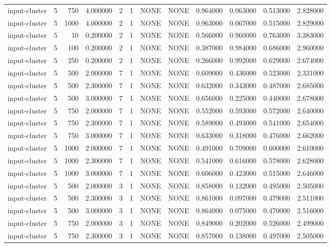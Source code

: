 \begin{tabular}{lrrrllllrrrr}
input-cluster & 5 & 750 & 4.000000 & 2 & 1 & NONE & NONE & 0.964000 & 0.063000 & 0.513000 & 2.828000 \\
input-cluster & 5 & 1000 & 4.000000 & 2 & 1 & NONE & NONE & 0.963000 & 0.067000 & 0.515000 & 2.829000 \\
input-cluster & 5 & 10 & 0.200000 & 2 & 1 & NONE & NONE & 0.566000 & 0.960000 & 0.763000 & 3.383000 \\
input-cluster & 5 & 100 & 0.200000 & 2 & 1 & NONE & NONE & 0.387000 & 0.984000 & 0.686000 & 2.960000 \\
input-cluster & 5 & 250 & 0.200000 & 2 & 1 & NONE & NONE & 0.266000 & 0.992000 & 0.629000 & 2.674000 \\
input-cluster & 5 & 500 & 2.000000 & 7 & 1 & NONE & NONE & 0.609000 & 0.436000 & 0.523000 & 2.331000 \\
input-cluster & 5 & 500 & 2.300000 & 7 & 1 & NONE & NONE & 0.632000 & 0.343000 & 0.487000 & 2.685000 \\
input-cluster & 5 & 500 & 3.000000 & 7 & 1 & NONE & NONE & 0.656000 & 0.225000 & 0.440000 & 2.678000 \\
input-cluster & 5 & 750 & 2.000000 & 7 & 1 & NONE & NONE & 0.552000 & 0.593000 & 0.572000 & 2.640000 \\
input-cluster & 5 & 750 & 2.300000 & 7 & 1 & NONE & NONE & 0.589000 & 0.493000 & 0.541000 & 2.654000 \\
input-cluster & 5 & 750 & 3.000000 & 7 & 1 & NONE & NONE & 0.633000 & 0.318000 & 0.476000 & 2.662000 \\
input-cluster & 5 & 1000 & 2.000000 & 7 & 1 & NONE & NONE & 0.491000 & 0.709000 & 0.600000 & 2.610000 \\
input-cluster & 5 & 1000 & 2.300000 & 7 & 1 & NONE & NONE & 0.541000 & 0.616000 & 0.578000 & 2.628000 \\
input-cluster & 5 & 1000 & 3.000000 & 7 & 1 & NONE & NONE & 0.606000 & 0.423000 & 0.515000 & 2.646000 \\
input-cluster & 5 & 500 & 2.000000 & 3 & 1 & NONE & NONE & 0.858000 & 0.132000 & 0.495000 & 2.505000 \\
input-cluster & 5 & 500 & 2.300000 & 3 & 1 & NONE & NONE & 0.861000 & 0.097000 & 0.479000 & 2.511000 \\
input-cluster & 5 & 500 & 3.000000 & 3 & 1 & NONE & NONE & 0.864000 & 0.075000 & 0.470000 & 2.516000 \\
input-cluster & 5 & 750 & 2.000000 & 3 & 1 & NONE & NONE & 0.849000 & 0.202000 & 0.526000 & 2.499000 \\
input-cluster & 5 & 750 & 2.300000 & 3 & 1 & NONE & NONE & 0.857000 & 0.138000 & 0.497000 & 2.505000 \\

\end{tabular}
